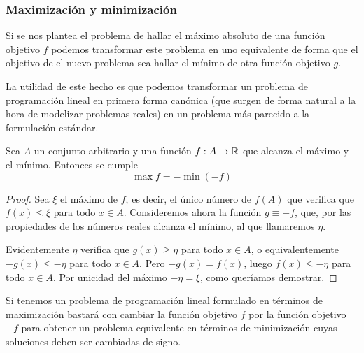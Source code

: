 \subsubsection{Maximización y minimización}
Si se nos plantea el problema de hallar el máximo absoluto de una función objetivo $f$ podemos transformar este problema en uno equivalente de forma que el objetivo de el nuevo problema sea hallar el mínimo de otra función objetivo $g$.

La utilidad de este hecho es que podemos transformar un problema de programación lineal en primera forma canónica (que surgen de forma natural a la hora de modelizar problemas reales) en un problema más parecido a la formulación estándar.
\begin{lem}
	Sea $A$ un conjunto arbitrario y una función $f:A\to\mathbb{R}$ que alcanza el máximo y el mínimo. Entonces se cumple
	\begin{equation*}
		\max f=-\min (-f)
	\end{equation*}
\end{lem}
\begin{proof}
	Sea $\xi$ el máximo de $f$, es decir, el único número de $f(A)$ que verifica que $f(x)\leq \xi$ para todo $x\in A$. Consideremos ahora la función $g\equiv -f$, que, por las propiedades de los números reales alcanza el mínimo, al que llamaremos $\eta$.
	
	Evidentemente $\eta$ verifica que $g(x)\geq \eta$ para todo $x\in A$, o equivalentemente $-g(x)\leq -\eta$ para todo $x\in A$. Pero $-g(x)=f(x)$, luego $f(x)\leq -\eta$ para todo $x\in A$. Por unicidad del máximo $-\eta =\xi$, como queríamos demostrar.
\end{proof}
\begin{obs}[Aplicación]
	Si tenemos un problema de programación lineal formulado en términos de maximización bastará con cambiar la función objetivo $f$ por la función objetivo $-f$ para obtener un problema equivalente en términos de minimización cuyas soluciones deben ser cambiadas de signo.
\end{obs}
